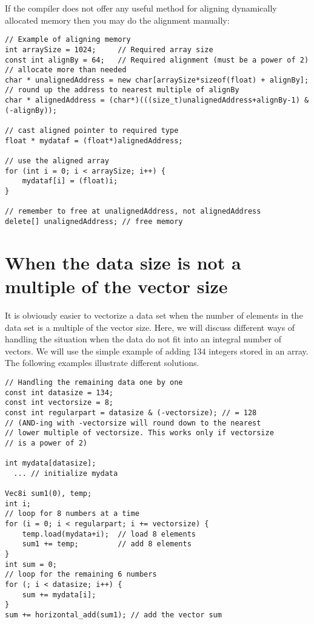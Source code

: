 \documentclass[vcl_manual.tex]{subfiles}
\begin{document}
If the compiler does not offer any useful method for aligning dynamically allocated memory then you may do the alignment manually:

\begin{lstlisting}[frame=none]
// Example of aligning memory
int arraySize = 1024;     // Required array size
const int alignBy = 64;   // Required alignment (must be a power of 2)
// allocate more than needed
char * unalignedAddress = new char[arraySize*sizeof(float) + alignBy];
// round up the address to nearest multiple of alignBy
char * alignedAddress = (char*)(((size_t)unalignedAddress+alignBy-1) & (-alignBy));

// cast aligned pointer to required type
float * mydataf = (float*)alignedAddress;

// use the aligned array
for (int i = 0; i < arraySize; i++) {
    mydataf[i] = (float)i;
}

// remember to free at unalignedAddress, not alignedAddress
delete[] unalignedAddress; // free memory

\end{lstlisting}



\section{When the data size is not a multiple of the vector size}\label{NotAMultipleOfVectorSize}

It is obviously easier to vectorize a data set when the number of elements in the data set is a multiple of the vector size. Here, we will discuss different ways of handling the situation when the data do not fit into an integral number of vectors. We will use the simple example of adding 134 integers stored in an array. The following examples illustrate different solutions.

\begin{example}
\label{exampleOddLoop1}
\end{example}
\begin{lstlisting}[frame=single]
// Handling the remaining data one by one
const int datasize = 134;
const int vectorsize = 8;
const int regularpart = datasize & (-vectorsize); // = 128
// (AND-ing with -vectorsize will round down to the nearest
// lower multiple of vectorsize. This works only if vectorsize
// is a power of 2)

int mydata[datasize];
  ... // initialize mydata

Vec8i sum1(0), temp;
int i;
// loop for 8 numbers at a time
for (i = 0; i < regularpart; i += vectorsize) {
    temp.load(mydata+i);  // load 8 elements
    sum1 += temp;         // add 8 elements
}
int sum = 0;
// loop for the remaining 6 numbers
for (; i < datasize; i++) {
    sum += mydata[i];
}
sum += horizontal_add(sum1); // add the vector sum
\end{lstlisting}
\end{document}
